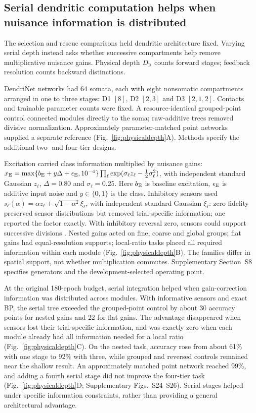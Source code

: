 \documentclass[11pt]{article}
\begin{document}
\subsection*{Serial dendritic computation helps when nuisance information is distributed}

The selection and rescue comparisons held dendritic architecture fixed. Varying serial depth instead asks whether successive compartments help remove multiplicative nuisance gains. Physical depth $D_{\rm p}$ counts forward stages; feedback resolution counts backward distinctions.

DendriNet networks had 64 somata, each with eight nonsomatic compartments arranged in one to three stages: D1 $[8]$, D2 $[2,3]$ and D3 $[2,1,2]$. Contacts and trainable parameter counts were fixed. A resource-identical grouped-point control connected modules directly to the soma; raw-additive trees removed divisive normalization. Approximately parameter-matched point networks supplied a separate reference (Fig.~\ref{fig:physicaldepth}A). Methods specify the additional two- and four-tier designs.

Excitation carried class information multiplied by nuisance gains: $x_{\rm E}=\max\{b_{\rm E}+y\Delta+\epsilon_{\rm E},10^{-4}\}\prod_\ell\exp(\sigma_\ell z_\ell-\tfrac12\sigma_\ell^2)$, with independent standard Gaussian $z_\ell$, $\Delta=0.80$ and $\sigma_\ell=0.25$. Here $b_{\rm E}$ is baseline excitation, $\epsilon_{\rm E}$ is additive input noise and $y\in\{0,1\}$ is the class. Inhibitory sensors used $s_\ell(\alpha)=\alpha z_\ell+\sqrt{1-\alpha^2}\xi_\ell$, with independent standard Gaussian $\xi_\ell$: zero fidelity preserved sensor distributions but removed trial-specific information; one reported the factor exactly. With inhibitory reversal zero, sensors could support successive divisions \citep{carandini2012normalization}. Nested gains acted on fine, coarse and global groups; flat gains had equal-resolution supports; local-ratio tasks placed all required information within each module (Fig.~\ref{fig:physicaldepth}B). The families differ in spatial support, not whether multiplication commutes. Supplementary Section~S8 specifies generators and the development-selected operating point.

At the original 180-epoch budget, serial integration helped when gain-correction information was distributed across modules. With informative sensors and exact BP, the serial tree exceeded the grouped-point control by about 30 accuracy points for nested gains and 22 for flat gains. The advantage disappeared when sensors lost their trial-specific information, and was exactly zero when each module already had all information needed for a local ratio (Fig.~\ref{fig:physicaldepth}C). On the nested task, accuracy rose from about 61\% with one stage to 92\% with three, while grouped and reversed controls remained near the shallow result. An approximately matched point network reached 99\%, and adding a fourth serial stage did not improve the four-tier task (Fig.~\ref{fig:physicaldepth}D; Supplementary Figs.~S24--S26). Serial stages helped under specific information constraints, rather than providing a general architectural advantage.
\end{document}
